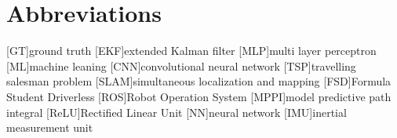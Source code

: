 \chapter{Abbreviations}

\begin{acronym}[AAPC]
	[GT]{ground truth}
	[EKF]{extended Kalman filter}
	[MLP]{multi layer perceptron}
	[ML]{machine leaning}
	[CNN]{convolutional neural network}
	[TSP]{travelling salesman problem}
	[SLAM]{simultaneous localization and mapping}
	[FSD]{Formula Student Driverless}
	[ROS]{Robot Operation System}
	[MPPI]{model predictive path integral}
	[ReLU]{Rectified Linear Unit}
	[NN]{neural network}
	[IMU]{inertial measurement unit}

\end{acronym}